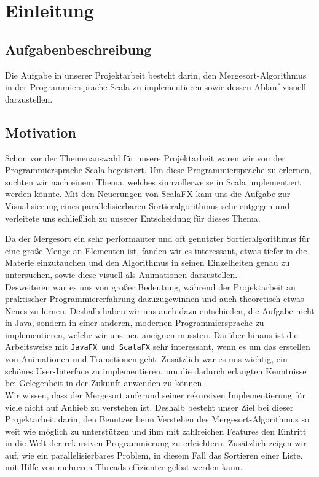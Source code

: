 \chapter{Einleitung}\label{chap:intro}
\section{Aufgabenbeschreibung}
Die Aufgabe in unserer Projektarbeit besteht darin, den Mergesort-Algorithmus in der Programmiersprache Scala zu implementieren sowie dessen Ablauf visuell darzustellen.
\section{Motivation}
Schon vor der Themenauswahl für unsere Projektarbeit waren wir von der Programmiersprache Scala begeistert. Um diese Programmiersprache zu erlernen, suchten wir nach einem Thema, welches sinnvollerweise in Scala implementiert werden könnte. Mit den Neuerungen von ScalaFX kam uns die Aufgabe zur Visualisierung eines parallelisierbaren Sortieralgorithmus sehr entgegen und verleitete uns schließlich zu unserer Entscheidung für dieses Thema.

Da der Mergesort ein sehr performanter und oft genutzter Sortieralgorithmus für eine große Menge an Elementen ist, fanden wir es interessant, etwas tiefer in die Materie einzutauchen und den Algorithmus in seinen Einzelheiten genau zu untersuchen, sowie diese visuell als Animationen darzustellen.\\
Desweiteren war es uns von großer Bedeutung, während der Projektarbeit an praktischer Programmiererfahrung dazuzugewinnen und auch theoretisch etwas Neues zu lernen. Deshalb haben wir uns auch dazu entschieden, die Aufgabe nicht in Java, sondern in einer anderen, modernen Programmiersprache zu implementieren, welche wir uns neu aneignen mussten. Darüber hinaus ist die Arbeitsweise mit \texttt{JavaFX und ScalaFX} sehr interessant, wenn es um das erstellen von Animationen und Transitionen geht. Zusätzlich war es uns wichtig, ein schönes User-Interface zu implementieren, um die dadurch erlangten Kenntnisse bei Gelegenheit in der Zukunft anwenden zu können.\\
Wir wissen, dass der Mergesort aufgrund seiner rekursiven Implementierung für viele nicht auf Anhieb zu verstehen ist. Deshalb besteht unser Ziel bei dieser Projektarbeit darin, den Benutzer beim Verstehen des Mergesort-Algorithmus so weit wie möglich zu unterstützen und ihm mit zahlreichen Features den Eintritt in die Welt der rekursiven Programmierung zu erleichtern. Zusätzlich zeigen wir auf, wie ein parallelisierbares Problem, in diesem Fall das Sortieren einer Liste, mit Hilfe von mehreren Threads effizienter gelöst werden kann.

